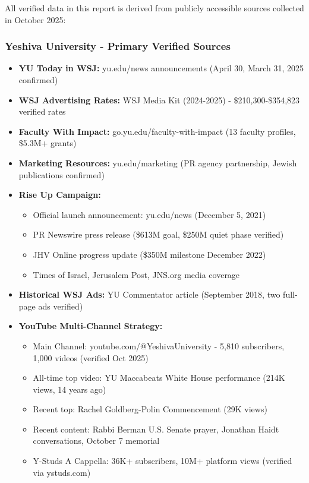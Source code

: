 \documentclass[12pt,letterpaper]{article}
\begin{document}
All verified data in this report is derived from publicly accessible sources collected in October 2025:

\subsubsection{Yeshiva University - Primary Verified Sources}
\begin{itemize}[leftmargin=*]
    \item \textbf{YU Today in WSJ:} yu.edu/news announcements (April 30, March 31, 2025 confirmed)
    \item \textbf{WSJ Advertising Rates:} WSJ Media Kit (2024-2025) - \$210,300-\$354,823 verified rates
    \item \textbf{Faculty With Impact:} go.yu.edu/faculty-with-impact (13 faculty profiles, \$5.3M+ grants)
    \item \textbf{Marketing Resources:} yu.edu/marketing (PR agency partnership, Jewish publications confirmed)
    \item \textbf{Rise Up Campaign:}
    \begin{itemize}
        \item Official launch announcement: yu.edu/news (December 5, 2021)
        \item PR Newswire press release (\$613M goal, \$250M quiet phase verified)
        \item JHV Online progress update (\$350M milestone December 2022)
        \item Times of Israel, Jerusalem Post, JNS.org media coverage
    \end{itemize}
    \item \textbf{Historical WSJ Ads:} YU Commentator article (September 2018, two full-page ads verified)
    \item \textbf{YouTube Multi-Channel Strategy:}
    \begin{itemize}
        \item Main Channel: youtube.com/@YeshivaUniversity - 5,810 subscribers, 1,000 videos (verified Oct 2025)
        \item All-time top video: YU Maccabeats White House performance (214K views, 14 years ago)
        \item Recent top: Rachel Goldberg-Polin Commencement (29K views)
        \item Recent content: Rabbi Berman U.S. Senate prayer, Jonathan Haidt conversations, October 7 memorial
        \item Y-Studs A Cappella: 36K+ subscribers, 10M+ platform views (verified via ystuds.com)

\end{itemize}
\end{itemize}
\end{document}
